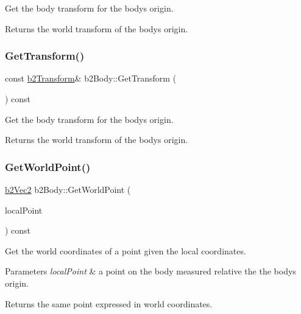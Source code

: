Get the body transform for the body\textquotesingle{}s origin. \begin{DoxyReturn}{Returns}
the world transform of the body\textquotesingle{}s origin. 
\end{DoxyReturn}
\mbox{\label{classb2Body_a23d09b0b15585eb9627007925fddf317}} 
\subsubsection{\texorpdfstring{Get\+Transform()}{GetTransform()}\hspace{0.1cm}{\footnotesize\ttfamily [2/2]}}
{\footnotesize\ttfamily const \hyperlink{structb2Transform}{b2\+Transform}\& b2\+Body\+::\+Get\+Transform (\begin{DoxyParamCaption}{ }\end{DoxyParamCaption}) const}

Get the body transform for the body\textquotesingle{}s origin. \begin{DoxyReturn}{Returns}
the world transform of the body\textquotesingle{}s origin. 
\end{DoxyReturn}
\mbox{\label{classb2Body_a712b782c61963c6f07beca86acc631ae}} 
\subsubsection{\texorpdfstring{Get\+World\+Point()}{GetWorldPoint()}\hspace{0.1cm}{\footnotesize\ttfamily [1/2]}}
{\footnotesize\ttfamily \hyperlink{structb2Vec2}{b2\+Vec2} b2\+Body\+::\+Get\+World\+Point (\begin{DoxyParamCaption}\item[{const \hyperlink{structb2Vec2}{b2\+Vec2} \&}]{local\+Point }\end{DoxyParamCaption}) const\hspace{0.3cm}{\ttfamily [inline]}}

Get the world coordinates of a point given the local coordinates. 
\begin{DoxyParams}{Parameters}
{\em local\+Point} & a point on the body measured relative the the body\textquotesingle{}s origin. \\
\hline
\end{DoxyParams}
\begin{DoxyReturn}{Returns}
the same point expressed in world coordinates. 
\end{DoxyReturn}
\mbox{\label{classb2Body_a712b782c61963c6f07beca86acc631ae}} 
